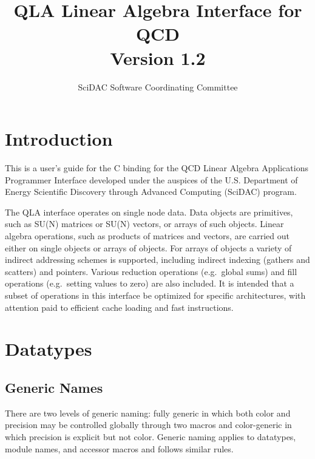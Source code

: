 \documentclass{article}
\begin{document}
\title{
   QLA Linear Algebra Interface for QCD \\{\large Version 1.2}
}
\author{ SciDAC Software Coordinating Committee}

\maketitle
\section{Introduction}
This is a user's guide for the C binding for the QCD Linear Algebra
Applications Programmer Interface developed under the auspices of the
U.S. Department of Energy Scientific Discovery through Advanced
Computing (SciDAC) program.

The QLA interface operates on single node data.  Data objects are
primitives, such as SU(N) matrices or SU(N) vectors, or arrays of such
objects.  Linear algebra operations, such as products of matrices and
vectors, are carried out either on single objects or arrays of
objects.  For arrays of objects a variety of indirect addressing
schemes is supported, including indirect indexing (gathers and
scatters) and pointers.  Various reduction operations (e.g.\ global
sums) and fill operations (e.g.\ setting values to zero) are also
included.  It is intended that a subset of operations in this
interface be optimized for specific architectures, with attention
paid to efficient cache loading and fast instructions.

\section{Datatypes}
\label{sec.datatypes}

\subsection{Generic Names}

There are two levels of generic naming: fully generic in which both
color and precision may be controlled globally through two macros and
color-generic in which precision is explicit but not color.  Generic
naming applies to datatypes, module names, and accessor macros and
follows similar rules.
\end{document}
